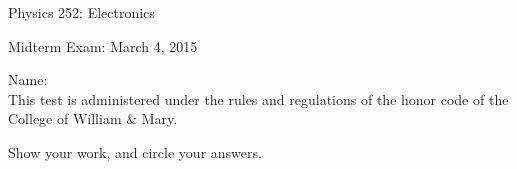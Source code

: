 \documentclass[letterpaper,addpoints,answers]{exam}
\begin{document}
\begin{coverpages}
 \large\bfseries
 
 \noindent 
 Physics 252: Electronics
 
 \vspace{2ex}
 \noindent
 Midterm Exam: March 4, 2015

 \vspace{5ex}
 \noindent 
 Name:\enspace\makebox[2in]{\hrulefill}\\

 \vspace{5ex}
 \noindent 
 This test is administered under the rules and regulations of the honor 
 code of the College of William \& Mary.  

 \vspace{5ex}
 \noindent 
 Show your work, and circle your answers.
 
 \pagebreak
 \vspace{5ex}
 \begin{center}
  \combinedgradetable[v][questions]
 \end{center}
\end{coverpages}
 
\end{document}
